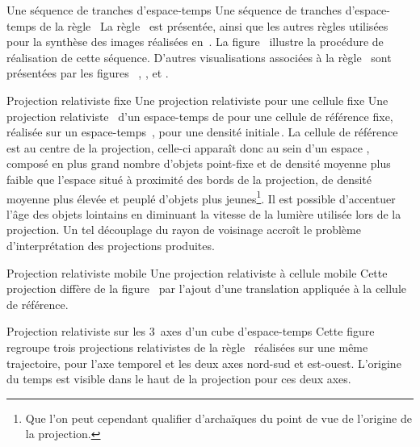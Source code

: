 %
{Une s\'equence de tranches d'espace-temps}%
{Une s\'equence de tranches d'espace-temps de la r\`egle~}%
{La r\`egle~ est pr\'esent\'ee, ainsi que les autres r\`egles
  utilis\'ees pour la synth\`ese des images r\'ealis\'ees
  en~. %
  La figure~ illustre la proc\'edure de r\'ealisation
  de cette s\'equence. %
  D'autres visualisations associ\'ees \`a la r\`egle~ sont
  pr\'esent\'ees par les figures~%
  , %
  , %
  et .}

%
{Projection relativiste fixe}%
{Une projection relativiste pour une cellule fixe}%
{Une projection relativiste~ d'un
  espace-temps de  pour une cellule de r\'ef\'erence fixe,
  r\'ealis\'ee sur un espace-temps~, pour une densit\'e
  initiale\,\Sundemi. %
  La cellule de r\'ef\'erence est au centre de la projection, %
  celle-ci appara\^it donc au sein d'un espace ,
  compos\'e en plus grand nombre d'objets point-fixe et %
  de densit\'e moyenne  plus faible %
  que l'espace situ\'e \`a proximit\'e des bords de la projection, %
  de densit\'e moyenne plus \'elev\'ee et peupl\'e d'objets plus jeunes\footnote{%
    Que l'on peut cependant qualifier d'archa\"iques du point de vue de
    l'origine de la projection.}. %
  Il est possible d'accentuer l'\^age des objets lointains en diminuant la
  vitesse de la lumi\`ere utilis\'ee lors de la projection. %
  Un tel d\'ecouplage du rayon de voisinage accro\^it le probl\`eme
  d'interpr\'etation des projections produites.}

%
{Projection relativiste mobile}%
{Une projection relativiste \`a cellule mo\-bile}%
{Cette projection diff\`ere de la figure~ par
  l'ajout d'une translation appliqu\'ee \`a la cellule de r\'ef\'erence.}

%
{}%
{Projection relativiste sur les 3~axes d'un cube d'espace-temps}%
{Cette figure regroupe trois projections relativistes de la
  r\`egle~ r\'ealis\'ees sur une m\^eme trajectoire, %
  pour l'axe temporel et les deux axes nord-sud et est-ouest. %
  L'origine du temps est visible dans le haut de la projection pour
  ces deux axes.}

